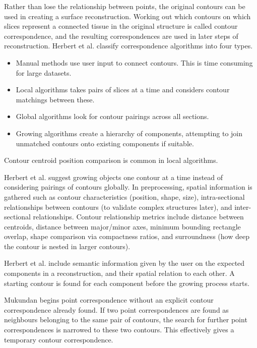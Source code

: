 \documentclass[11p, titlepage]{article}
\begin{document}
Rather than lose the relationship between points, the original contours can be used in creating a surface reconstruction. Working out which contours on which slices represent a connected tissue in the original structure is called contour correspondence, and the resulting correspondences are used in later steps of reconstruction.
\newline
\linebreak
Herbert et al. \cite{herbert2001contour} classify correspondence algorithms into four types. \begin{itemize}
\item Manual methods use user input to connect contours. This is time consuming for large datasets.
\item Local algorithms takes pairs of slices at a time and considers contour matchings between these.
\item Global algorithms look for contour pairings across all sections.
\item Growing algorithms create a hierarchy of components, attempting to join unmatched contours onto existing components if suitable.
\end{itemize}

Contour centroid position comparison is common in local algorithms.

Herbert et al. \cite{herbert2001contour} suggest growing objects one contour at a time instead of considering pairings of contours globally. In preprocessing, spatial information is gathered such as contour characteristics (position, shape, size), intra-sectional relationships between contours (to validate complex structures later), and inter-sectional relationships. Contour relationship metrics include distance between centroids, distance between major/minor axes, minimum bounding rectangle overlap, shape comparison via compactness ratios, and surroundness (how deep the contour is nested in larger contours).

Herbert et al. \cite{herbert2001contour} include semantic information given by the user on the expected components in a reconstruction, and their spatial relation to each other. A starting contour is found for each component before the growing process starts.

Mukundan \cite{mukundan2016reconstruction} begins point correspondence without an explicit contour correspondence already found. If two point correspondences are found as neighbours belonging to the same pair of contours, the search for further point correspondences is narrowed to these two contours. This effectively gives a temporary contour correspondence.
\end{document}

